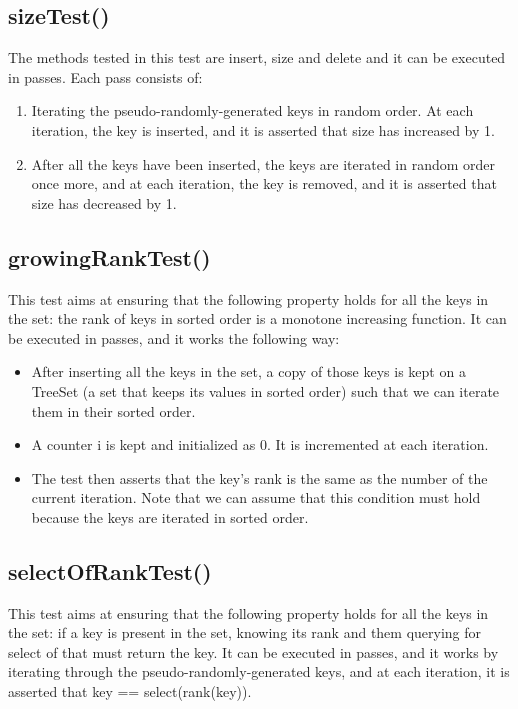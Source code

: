 \subsection{{\ttfamily sizeTest()}}

The methods tested in this test are {\ttfamily insert}, {\ttfamily size} and {\ttfamily delete} and it can be executed in passes. Each pass consists of:
\begin{enumerate}
    \item
    Iterating the pseudo-randomly-generated keys in random order. At each iteration, the key is inserted, and it is asserted that {\ttfamily size} has increased by 1.
    \item
    After all the keys have been inserted, the keys are iterated in random order once more, and at each iteration, the key is removed, and it is asserted that {\ttfamily size} has decreased by 1.
\end{enumerate}

\subsection{{\ttfamily growingRankTest()}}

This test aims at ensuring that the following property holds for all the keys in the set: the rank of keys in sorted order is a monotone increasing function. It can be executed in passes, and it works the following way:
\begin{itemize}
    \item
    After inserting all the keys in the set, a copy of those keys is kept on a {\ttfamily TreeSet} (a set that keeps its values in sorted order) such that we can iterate them in their sorted order.
    \item
    A counter {\ttfamily i} is kept and initialized as $0$. It is incremented at each iteration.
    \item
    The test then asserts that the key's rank is the same as the number of the current iteration. Note that we can assume that this condition must hold because the keys are iterated in sorted order. 
\end{itemize}

\subsection{{\ttfamily selectOfRankTest()}}

This test aims at ensuring that the following property holds for all the keys in the set: if a key is present in the set, knowing its rank and them querying for select of that must return the key. It can be executed in passes, and it works by iterating through the pseudo-randomly-generated keys, and at each iteration, it is asserted that {\ttfamily key == select(rank(key))}.

